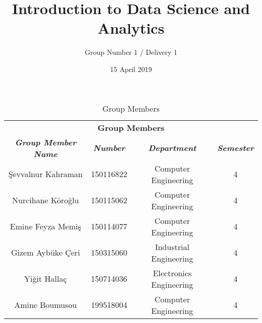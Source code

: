 \documentclass{article}
\title{Introduction to Data Science and Analytics}
\author{Group Number 1 / Delivery 1}
\date{15 April 2019}
\begin{document}
\maketitle


\begin{table}[htbp]
\caption{Group Members}
\begin{center}
\begin{tabular}{|c|c|c|c|}
\hline
\multicolumn{4}{|c|}{\textbf{Group Members}} \\
\cline{1-4} 
\textbf{\textit{Group Member Name}}&
\textbf{\textit{Number}}&
\textbf{\textit{Department}}&
\textbf{\textit{Semester}} \\
\hline
Şevvalnur Kahraman & 150116822 & Computer Engineering & 4 \\
\hline
Nurcihane Köroğlu & 150115062 & Computer Engineering & 4 \\
\hline
Emine Feyza Memiş & 150114077 & Computer Engineering & 4 \\
\hline
Gizem Aybüke Çeri & 150315060 & Industrial Engineering & 4 \\
\hline
Yiğit Hallaç & 150714036 & Electronics Engineering & 4 \\
\hline
Amine Boumusou & 199518004 & Computer Engineering & 4 \\
\hline
\end{tabular}
\label{tab1}
\end{center}
\end{table}
\end{document}
